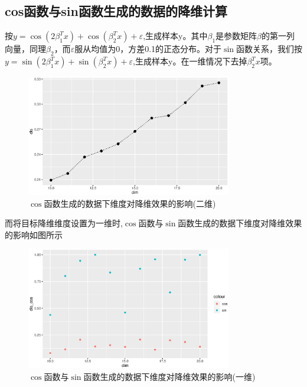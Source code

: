 \subsection{cos函数与sin函数生成的数据的降维计算}
按$y=\cos(2\beta_1^Tx)+\cos(\beta_2^Tx)+\varepsilon$,生成样本y。其中$\beta_1$是参数矩阵$\beta$的第一列向量，同理$\beta_2$，而$\varepsilon$服从均值为0，方差0.1的正态分布。对于$\sin$函数关系，我们按$y=\sin(2\beta_1^Tx)+\sin(\beta_2^Tx)+\varepsilon$,生成样本y。在一维情况下去掉$\beta_2^Tx$项。
\begin{figure}[H]
    \centering
    \includegraphics[width=0.8\textwidth]{image/cos_save.eps}
    \caption{$\cos$函数生成的数据下维度对降维效果的影响(二维)}
\end{figure}

而将目标降维维度设置为一维时,$\cos$函数与$\sin$函数生成的数据下维度对降维效果的影响如图所示
\begin{figure}[H]
    \centering
    \includegraphics[width=0.8\textwidth]{image/compare_save_one.eps}
    \caption{$\cos$函数与$\sin$函数生成的数据下维度对降维效果的影响(一维)}
\end{figure}

